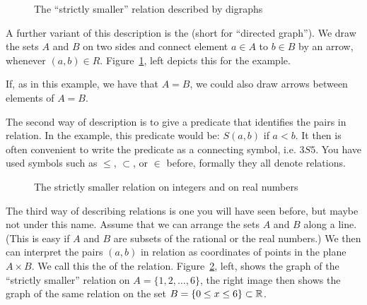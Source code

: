 \begin{figure}[t]
\begin{center}
\qquad
\end{center}
\caption{The ``strictly smaller'' relation described by digraphs}
\label{figRelDigraph}
\end{figure}

A further variant of this description is the  (short for
``directed graph''). We draw the sets $A$ and $B$ on two sides and connect
element $a\in A$ to $b\in B$ by an arrow, whenever $(a,b)\in R$.
Figure~\ref{figRelDigraph}, left depicts this for the example.
\smallskip

If, as in this example, we have that $A=B$, we could also draw arrows between elements
of $A=B$.

\medskip

The second way of description is to give a predicate that 
identifies the pairs in relation. In the example, this predicate would be:
$S(a,b)$ if
$a<b$. It then is often convenient to write the predicate as a connecting
symbol, i.e. $3S5$. You have used symbols such as $\le$,
$\subset$, or $\in$ before, formally they all denote relations.
\medskip

\begin{figure}[t]
\begin{center}
\end{center}
\caption{The strictly smaller relation on integers and on real numbers}
\label{figsmaller}
\end{figure}

The third way of describing relations is one you will have seen before, but
maybe not under this name. Assume that we can arrange the sets $A$ and $B$
along a line. (This is easy if $A$ and $B$ are subsets of the rational or
the real numbers.)
We then can interpret the pairs $(a,b)$ in relation as coordinates of points
in the plane $A\times B$.
We call this the  of the
relation. Figure~\ref{figsmaller}, left, shows the graph of the ``strictly
smaller'' relation on $A=\{1,2,\ldots,6\}$, the right image then shows the
graph of the same relation on the set $B=\{0\le x\le 6\}\subset{\mathbb R}$.

